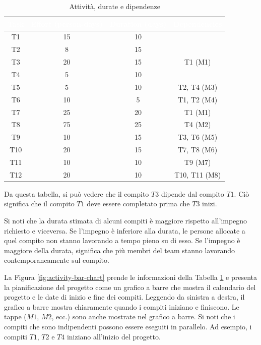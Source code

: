 \begin{table}[ht]
\centering
{}
\begin{tabular}{|c|c|c|c|}
\hline
\rowcolor{headerblue}
\textbf{\textcolor{white}{Task}} & \textbf{\textcolor{white}{Effort (person-days)}} & \textbf{\textcolor{white}{Duration (days)}} & \textbf{\textcolor{white}{Dependencies}} \\\hline
T1 & 15 & 10 & \\\hline
T2 & 8 & 15 & \\\hline
T3 & 20 & 15 & T1 (M1)\\\hline
T4 & 5 & 10 & \\\hline
T5 & 5 & 10 & T2, T4 (M3)\\\hline
T6 & 10 & 5 & T1, T2 (M4)\\\hline
T7 & 25 & 20 & T1 (M1)\\\hline
T8 & 75 & 25 & T4 (M2)\\\hline
T9 & 10 & 15 & T3, T6 (M5)\\\hline
T10 & 20 & 15 & T7, T8 (M6)\\\hline
T11 & 10 & 10 & T9 (M7)\\\hline
T12 & 20 & 10 & T10, T11 (M8)
\\\hline
\end{tabular}
\caption{Attività, durate e dipendenze}
\label{tab:tasks-durations-dependencies}
\end{table}

Da questa tabella, si può vedere che il compito $T3$ dipende dal compito $T1$. Ciò significa che il compito $T1$ deve essere completato prima che $T3$ inizi.

Si noti che la durata stimata di alcuni compiti è maggiore rispetto all'impegno richiesto e viceversa. Se l’impegno è inferiore alla durata, le persone allocate a quel compito non stanno lavorando a tempo pieno su di esso. Se l’impegno è maggiore della durata, significa che più membri del team stanno lavorando contemporaneamente sul compito.

La Figura \ref{fig:activity-bar-chart} prende le informazioni della Tabella \ref{tab:tasks-durations-dependencies} e presenta la pianificazione del progetto come un grafico a barre che mostra il calendario del progetto e le date di inizio e fine dei compiti. Leggendo da sinistra a destra, il grafico a barre mostra chiaramente quando i compiti iniziano e finiscono. Le tappe ($M1$, $M2$, ecc.) sono anche mostrate nel grafico a barre. Si noti che i compiti che sono indipendenti possono essere eseguiti in parallelo. Ad esempio, i compiti $T1$, $T2$ e $T4$ iniziano all'inizio del progetto.

